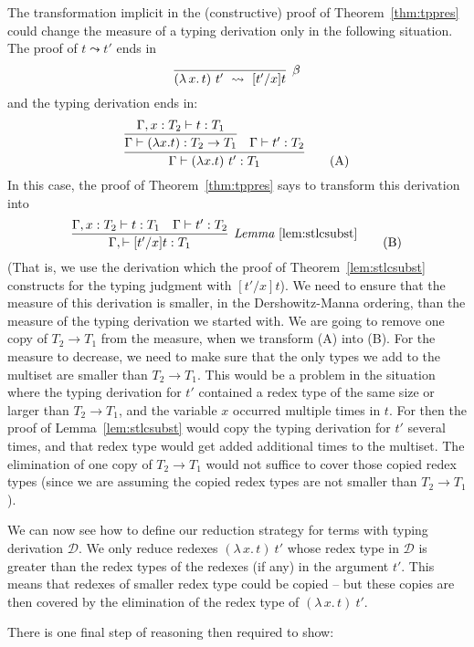 \documentclass{article}
\providecommand{\betarule}[0]{\infer[\beta]{(\lambda\,x.\, t)\ t'\ \leadsto\ [t'/x]t}
                                {\ }}
\begin{document}
The transformation implicit in the (constructive) proof of Theorem~\ref{thm:tppres}
could change the measure of a typing derivation only in the following situation.  The
proof of $t \leadsto t'$ ends in
\[ 
\betarule
\]
\noindent and the typing derivation ends in:
\begin{equation} 
\infer{\Gamma \vdash (\lambda x.t)\ t' : T_1}
       {\infer{\Gamma \vdash (\lambda x.t) : T_2\to T_1}
              {\Gamma, x : T_2 \vdash t : T_1} & \Gamma \vdash t' : T_2}
\tag{A}
\end{equation}
\noindent In this case, the proof of Theorem~\ref{thm:tppres} says
to transform this derivation into
\begin{equation}
\infer[\textit{Lemma}~\ref{lem:stlcsubst}]
      {\Gamma,\vdash [t'/x]t:T_1}
      {\Gamma, x : T_2 \vdash t : T_1 & \Gamma \vdash t' : T_2}
\tag{B}
\end{equation}
\noindent (That is, we use the derivation which the proof of Theorem~\ref{lem:stlcsubst} constructs
for the typing judgment with $[t'/x]t$).  We need to ensure that the measure of this derivation is smaller,
in the Dershowitz-Manna ordering, than the measure of the typing derivation
we started with.  We are going to remove one copy of $T_2 \to T_1$ from
the measure, when we transform (A) into (B).  For the measure to decrease,
we need to make sure that the only types we add to the multiset are smaller than $T_2 \to T_1$.
This would be a problem in the situation where the typing derivation for $t'$ contained a redex
type of the same size or larger than $T_2 \to T_1$, and the variable $x$ occurred multiple times in $t$.  For then
the proof of Lemma~\ref{lem:stlcsubst} would copy the typing derivation for $t'$
several times, and that redex type would get added additional times to the multiset.  The elimination
of one copy of $T_2 \to T_1$ would not suffice to cover those copied redex types (since we are assuming
the copied redex types are not smaller than $T_2 \to T_1$).

We can now see how to define our reduction strategy for terms
with typing derivation $\mathcal{D}$.  We only reduce redexes $(\lambda\,x.\,t)\ t'$ whose
redex type in $\mathcal{D}$ is greater than the redex types of the
redexes (if any) in the argument $t'$.  This means that redexes of smaller
redex type could be copied -- but these copies are then covered by the
elimination of the redex type of $(\lambda\,x.\,t)\ t'$.

There is one final step of reasoning then required to show:
\end{document}
